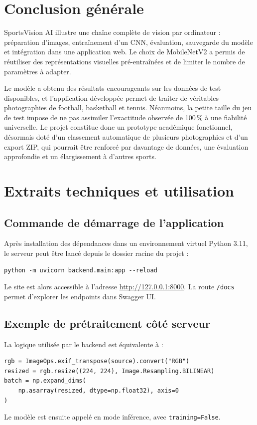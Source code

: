 \documentclass[11pt,a4paper,oneside]{report}
\begin{document}
\chapter{Conclusion générale}
SportsVision AI illustre une chaîne complète de vision par ordinateur : préparation d'images, entraînement d'un CNN, évaluation, sauvegarde du modèle et intégration dans une application web. Le choix de MobileNetV2 a permis de réutiliser des représentations visuelles pré-entraînées et de limiter le nombre de paramètres à adapter.

Le modèle a obtenu des résultats encourageants sur les données de test disponibles, et l'application développée permet de traiter de véritables photographies de football, basketball et tennis. Néanmoins, la petite taille du jeu de test impose de ne pas assimiler l'exactitude observée de 100\,\% à une fiabilité universelle. Le projet constitue donc un prototype académique fonctionnel, désormais doté d'un classement automatique de plusieurs photographies et d'un export ZIP, qui pourrait être renforcé par davantage de données, une évaluation approfondie et un élargissement à d'autres sports.

\appendix
\chapter{Extraits techniques et utilisation}
\section{Commande de démarrage de l'application}
Après installation des dépendances dans un environnement virtuel Python 3.11, le serveur peut être lancé depuis le dossier racine du projet :
\begin{lstlisting}
python -m uvicorn backend.main:app --reload
\end{lstlisting}
Le site est alors accessible à l'adresse \url{http://127.0.0.1:8000}. La route \texttt{/docs} permet d'explorer les endpoints dans Swagger UI.
\section{Exemple de prétraitement côté serveur}
La logique utilisée par le backend est équivalente à :
\begin{lstlisting}
rgb = ImageOps.exif_transpose(source).convert("RGB")
resized = rgb.resize((224, 224), Image.Resampling.BILINEAR)
batch = np.expand_dims(
    np.asarray(resized, dtype=np.float32), axis=0
)
\end{lstlisting}
Le modèle est ensuite appelé en mode inférence, avec \texttt{training=False}.
\end{document}
